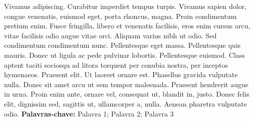 Vivamus adipiscing. Curabitur imperdiet tempus turpis. Vivamus sapien dolor, congue venenatis, euismod eget, porta rhoncus, magna. Proin condimentum pretium enim. Fusce fringilla, libero et venenatis facilisis, eros enim cursus arcu, vitae facilisis odio augue vitae orci. Aliquam varius nibh ut odio. Sed condimentum condimentum nunc. Pellentesque eget massa. Pellentesque quis mauris. Donec ut ligula ac pede pulvinar lobortis. Pellentesque euismod. Class aptent taciti sociosqu ad litora torquent per conubia nostra, per inceptos hymenaeos. Praesent elit. Ut laoreet ornare est. Phasellus gravida vulputate nulla. Donec sit amet arcu ut sem tempor malesuada. Praesent hendrerit augue in urna. Proin enim ante, ornare vel, consequat ut, blandit in, justo. Donec felis elit, dignissim sed, sagittis ut, ullamcorper a, nulla. Aenean pharetra vulputate odio.
\vfill
\textbf{Palavras-chave:} Palavra 1; Palavra 2; Palavra 3